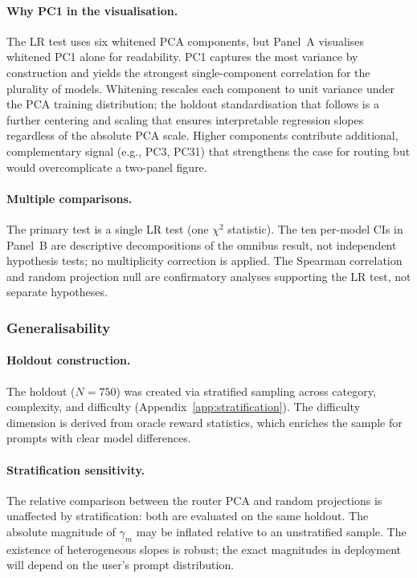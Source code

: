 \paragraph{Why PC1 in the visualisation.}
The LR test uses six whitened PCA components, but Panel~A visualises
whitened PC1 alone for readability.  PC1 captures the most variance by
construction and yields the strongest single-component correlation for the
plurality of models.  Whitening rescales each component to unit variance
under the PCA training distribution; the holdout standardisation that
follows is a further centering and scaling that ensures interpretable
regression slopes regardless of the absolute PCA scale.  Higher
components contribute additional, complementary signal (e.g., PC3, PC31)
that strengthens the case for routing but would overcomplicate a
two-panel figure.

\paragraph{Multiple comparisons.}
The primary test is a single LR test (one $\chi^2$ statistic).
The ten per-model CIs in Panel~B are descriptive decompositions of the
omnibus result, not independent hypothesis tests; no multiplicity
correction is applied.  The Spearman correlation and random projection
null are confirmatory analyses supporting the LR test, not separate
hypotheses.

\subsubsection{Generalisability}

\paragraph{Holdout construction.}
The holdout ($N{=}750$) was created via stratified sampling across
category, complexity, and difficulty (Appendix~\ref{app:stratification}).
The difficulty dimension is derived from oracle reward statistics, which
enriches the sample for prompts with clear model differences.

\paragraph{Stratification sensitivity.}
The relative comparison between the router PCA and random projections is
unaffected by stratification: both are evaluated on the same holdout.
The absolute magnitude of $\gamma_m$ may be inflated relative to an
unstratified sample.
The existence of heterogeneous slopes is robust; the exact magnitudes
in deployment will depend on the user's prompt distribution.
